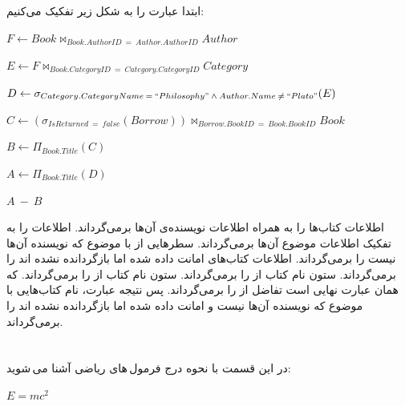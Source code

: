 \documentclass{article}
\begin{document}
\subsection{}
ابتدا عبارت را به شکل زیر تفکیک می‌کنیم:
\begin{center}
$
F
\leftarrow
Book
\bowtie_{Book.AuthorID\:=\:Author.AuthorID}
Author
$
\end{center}
\begin{center}
$
E
\leftarrow
F
\bowtie_{Book.CategoryID\:=\:Category.CategoryID}
Category
$
\end{center}
\begin{center}
$
D
\leftarrow
\sigma_{Category.CategoryName\:=\:``Philosophy"\:\wedge\:Author.Name\:\neq\:``Plato"}
(E)
$
\end{center}
\begin{center}
$
C
\leftarrow
(\sigma_{IsReturned\:=\:false}(Borrow))
\bowtie_{Borrow.BookID\:=\:Book.BookID}
Book
$
\end{center}
\begin{center}
$
B
\leftarrow
\Pi_{Book.Title}(C)
$
\end{center}
\begin{center}
$
A
\leftarrow
\Pi_{Book.Title}(D)
$
\end{center}
\begin{center}
$
A\:-\:B
$
\end{center}
اطلاعات کتاب‌ها را به همراه اطلاعات نویسنده‌ی آن‌ها برمی‌گرداند.
\newline
{}
اطلاعات
را به تفکیک اطلاعات موضوع آن‌ها برمی‌گرداند.
\newline
{}
سطرهایی از
با موضوع
که نویسنده آن‌ها
نیست را برمی‌گرداند.
\newline
{}
اطلاعات کتاب‌های امانت داده شده اما بازگردانده نشده اند را برمی‌گرداند.
\newline
{}
ستون نام کتاب از
را برمی‌گرداند.
\newline
{}
ستون نام کتاب از
را برمی‌گرداند.
\newline
{}
که همان عبارت نهایی است تفاضل
از
را برمی‌گرداند.
\newline
پس نتیجه عبارت، نام کتاب‌هایی با موضوع
که نویسنده آن‌ها
نیست و امانت داده شده اما بازگردانده نشده اند را برمی‌گرداند.

\section{}
در این قسمت با نحوه درج فرمول\,های ریاضی آشنا می\,شوید:
\begin{center}
$E = m{c}^{2}$
\end{center}
\end{document}
